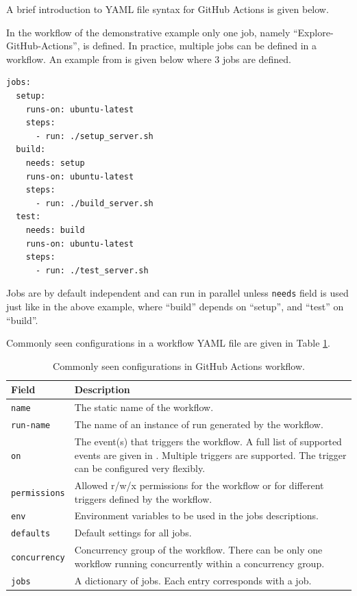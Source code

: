 A brief introduction to YAML file syntax for GitHub Actions is given below.

In the workflow of the demonstrative example only one job, namely ``Explore-GitHub-Actions'', is defined. In practice, multiple jobs can be defined in a workflow. An example from \cite{git2025reference} is given below where 3 jobs are defined.
\begin{lstlisting}
jobs:
  setup:
    runs-on: ubuntu-latest
    steps:
      - run: ./setup_server.sh
  build:
    needs: setup
    runs-on: ubuntu-latest
    steps:
      - run: ./build_server.sh
  test:
    needs: build
    runs-on: ubuntu-latest
    steps:
      - run: ./test_server.sh
\end{lstlisting}
Jobs are by default independent and can run in parallel unless \verb|needs| field is used just like in the above example, where ``build'' depends on ``setup'', and ``test'' on ``build''.

Commonly seen configurations in a workflow YAML file are given in Table \ref{tab:githubactions_workflow}.
\begin{table}[!htb]
	\centering \caption{Commonly seen configurations in GitHub Actions workflow.}\label{tab:githubactions_workflow}
	\begin{tabularx}{\textwidth}{lX}
		\hline
		Field & Description \\ \hline
		\texttt{name} & The static name of the workflow.  \\ 
		\texttt{run-name} & The name of an instance of run generated by the workflow.  \\ 
		\texttt{on} & The event(s) that triggers the workflow. A full list of supported events are given in \cite{git2025reference}. Multiple triggers are supported. The trigger can be configured very flexibly. \\ 
		\texttt{permissions} & Allowed r/w/x permissions for the workflow or for different triggers defined by the workflow. \\ 
		\texttt{env} & Environment variables to be used in the jobs descriptions. \\
		\texttt{defaults} & Default settings for all jobs. \\
        \texttt{concurrency} & Concurrency group of the workflow. There can be only one workflow running concurrently within a concurrency group. \\
        \texttt{jobs} & A dictionary of jobs. Each entry corresponds with a job. \\
		\hline
	\end{tabularx}
\end{table}

